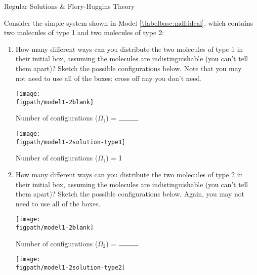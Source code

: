 \begin{activity}{Regular Solutions \& Flory-Huggins Theory}
\begin{model}
\end{model}

\vspace{0.05in}
\begin{ctqs}

	\question Consider the simple system shown in Model \ref{\labelbase:mdl:ideal}, which contains two molecules of type 1 and two molecules of type 2: \label{\labelbase:ctq:toyconfigs}
	
		\begin{enumerate}
			\item How many different ways can you distribute the two molecules of type 1 in their initial box, assuming the molecules are indistinguishable (you can't tell them apart)?  Sketch the possible configurations below.  Note that you may not need to use all of the boxes; cross off any you don't need.
			
				\begin{solution}[1in]{

\centerline{\texttt{[image: \\figpath/model1-2blank]}}

						\vspace{0.1in}
						\centerline{Number of configurations ($\Omega_1$) = $\rule{1cm}{0.15mm}$}
					}

\centerline{\texttt{[image: \\figpath/model1-2solution-type1]}}

						\vspace{0.1in}
						\centerline{Number of configurations ($\Omega_1$) = 1}
					
				\end{solution}
		
			\item How many different ways can you distribute the two molecules of type 2 in their initial box, assuming the molecules are indistinguishable (you can't tell them apart)?  Sketch the possible configurations below. Again, you may not need to use all of the boxes.
			
				\begin{solution}[1in]{

\centerline{\texttt{[image: \\figpath/model1-2blank]}}

						\vspace{0.1in}
						\centerline{Number of configurations ($\Omega_2$) = $\rule{1cm}{0.15mm}$}
					}

\centerline{\texttt{[image: \\figpath/model1-2solution-type2]}}


\end{solution}
\end{enumerate}
\end{ctqs}
\end{activity}
